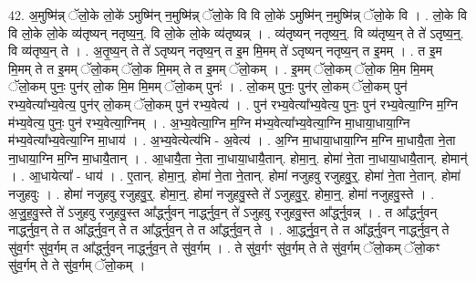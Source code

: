 \documentclass[17pt]{extarticle}
\begin{document}
42. अ॒मुष्मि॑न्न् ॅलो॒के लो॒के॑ ऽमुष्मि॑न् न॒मुष्मि॑न्न् ॅलो॒के वि वि लो॒के॑ ऽमुष्मि॑न् न॒मुष्मि॑न्न् ॅलो॒के वि । . लो॒के वि वि लो॒के लो॒के व्य॑तृष्यन् नतृष्य॒न्॒. वि लो॒के लो॒के व्य॑तृष्यन्न् । . व्य॑तृष्यन् नतृष्य॒न्॒. वि व्य॑तृष्य॒न् ते ते॑ ऽतृष्य॒न्॒. वि व्य॑तृष्य॒न् ते । . अ॒तृ॒ष्य॒न् ते ते॑ ऽतृष्यन् नतृष्य॒न् त इ॒म मि॒मम् ते॑ ऽतृष्यन् नतृष्य॒न् त इ॒मम् । . त इ॒म मि॒मम् ते त इ॒मम् ॅलो॒कम् ॅलो॒क मि॒मम् ते त इ॒मम् ॅलो॒कम् । . इ॒मम् ॅलो॒कम् ॅलो॒क मि॒म मि॒मम् ॅलो॒कम् पुनः॒ पुन॑र् लो॒क मि॒म मि॒मम् ॅलो॒कम् पुनः॑ । . लो॒कम् पुनः॒ पुन॑र् लो॒कम् ॅलो॒कम् पुन॑ रभ्य॒वेत्या᳚भ्य॒वेत्य॒ पुन॑र् लो॒कम् ॅलो॒कम् पुन॑ रभ्य॒वेत्य॑ । . पुन॑ रभ्य॒वेत्या᳚भ्य॒वेत्य॒ पुनः॒ पुन॑ रभ्य॒वेत्या॒ग्नि म॒ग्नि म॑भ्य॒वेत्य॒ पुनः॒ पुन॑ रभ्य॒वेत्या॒ग्निम् । . अ॒भ्य॒वेत्या॒ग्नि म॒ग्नि म॑भ्य॒वेत्या᳚भ्य॒वेत्या॒ग्नि मा॒धाया॒धाया॒ग्नि म॑भ्य॒वेत्या᳚भ्य॒वेत्या॒ग्नि मा॒धाय॑ । . अ॒भ्य॒वेत्येत्य॑भि - अ॒वेत्य॑ । . अ॒ग्नि मा॒धाया॒धाया॒ग्नि म॒ग्नि मा॒धायै॒ता ने॒ता ना॒धाया॒ग्नि म॒ग्नि मा॒धायै॒तान् । . आ॒धायै॒ता ने॒ता ना॒धाया॒धायै॒तान्. होमा॒न्॒. होमा॑ ने॒ता ना॒धाया॒धायै॒तान्. होमान्॑ । . आ॒धायेत्या᳚ - धाय॑ । . ए॒तान्. होमा॒न्॒. होमा॑ ने॒ता ने॒तान्. होमा॑ नजुहवु रजुहवु॒र्॒. होमा॑ ने॒ता ने॒तान्. होमा॑ नजुहवुः । . होमा॑ नजुहवु रजुहवु॒र्॒. होमा॒न्॒. होमा॑ नजुहवु॒स्ते ते॑ ऽजुहवु॒र्॒. होमा॒न्॒. होमा॑ नजुहवु॒स्ते । . अ॒जु॒ह॒वु॒स्ते ते॑ ऽजुहवु रजुहवु॒स्त आ᳚र्द्ध्नुवन् नार्द्ध्नुव॒न् ते॑ ऽजुहवु रजुहवु॒स्त आ᳚र्द्ध्नुवन्न् । . त आ᳚र्द्ध्नुवन् नार्द्ध्नुव॒न् ते त आ᳚र्द्ध्नुव॒न् ते त आ᳚र्द्ध्नुव॒न् ते त आ᳚र्द्ध्नुव॒न् ते । . आ॒र्द्ध्नु॒व॒न् ते त आ᳚र्द्ध्नुवन् नार्द्ध्नुव॒न् ते सु॑व॒र्गꣳ सु॑व॒र्गम् त आ᳚र्द्ध्नुवन् नार्द्ध्नुव॒न् ते सु॑व॒र्गम् । . ते सु॑व॒र्गꣳ सु॑व॒र्गम् ते ते सु॑व॒र्गम् ॅलो॒कम् ॅलो॒कꣳ सु॑व॒र्गम् ते ते सु॑व॒र्गम् ॅलो॒कम् । \newline
\end{document}
